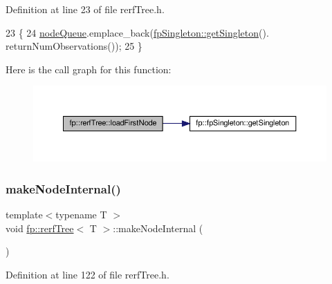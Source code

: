 Definition at line 23 of file rerf\+Tree.\+h.


\begin{DoxyCode}
23                                     \{
24                     \hyperlink{classfp_1_1rerfTree_a59b3bdcba86acbe93fd46658132218a8}{nodeQueue}.emplace\_back(\hyperlink{classfp_1_1fpSingleton_a8bdae77b68521003e3fc630edec2e240}{fpSingleton::getSingleton}().
      returnNumObservations());
25                 \}
\end{DoxyCode}
Here is the call graph for this function\+:
\nopagebreak
\begin{figure}[H]
\begin{center}
\leavevmode
\includegraphics[width=350pt]{classfp_1_1rerfTree_a00b09f0d455acaae7ae2d11db5d82478_cgraph}
\end{center}
\end{figure}
\mbox{\label{classfp_1_1rerfTree_adc3c8f338accaa401098a63d826390d3}} 
\subsubsection{\texorpdfstring{make\+Node\+Internal()}{makeNodeInternal()}}
{\footnotesize\ttfamily template$<$typename T $>$ \\
void \hyperlink{classfp_1_1rerfTree}{fp\+::rerf\+Tree}$<$ T $>$\+::make\+Node\+Internal (\begin{DoxyParamCaption}{ }\end{DoxyParamCaption})\hspace{0.3cm}{\ttfamily [inline]}}



Definition at line 122 of file rerf\+Tree.\+h.



